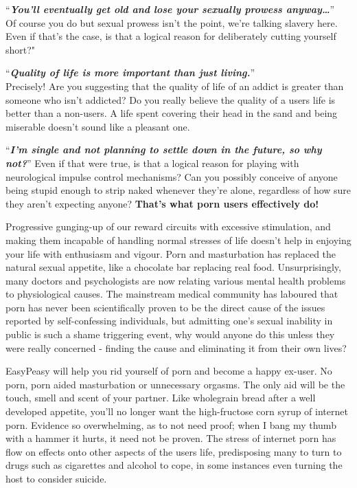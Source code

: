 \documentclass[
]{book}
\begin{document}
``\textbf{\emph{You'll eventually get old and lose your sexually prowess anyway\ldots{}}}''\\
Of course you do but sexual prowess isn't the point, we're talking slavery here. Even if that's the case, is that a logical reason for deliberately cutting yourself short?"

``\textbf{\emph{Quality of life is more important than just living.}}''\\
Precisely! Are you suggesting that the quality of life of an addict is greater than someone who isn't addicted? Do you really believe the quality of a users life is better than a non-users. A life spent covering their head in the sand and being miserable doesn't sound like a pleasant one.

``\textbf{\emph{I'm single and not planning to settle down in the future, so why not?}}''
Even if that were true, is that a logical reason for playing with neurological impulse control mechanisms? Can you possibly conceive of anyone being stupid enough to strip naked whenever they're alone, regardless of how sure they aren't expecting anyone? \textbf{That's what porn users effectively do!}

Progressive gunging-up of our reward circuits with excessive stimulation, and making them incapable of handling normal stresses of life doesn't help in enjoying your life with enthusiasm and vigour. Porn and masturbation has replaced the natural sexual appetite, like a chocolate bar replacing real food. Unsurprisingly, many doctors and psychologists are now relating various mental health problems to physiological causes. The mainstream medical community has laboured that porn has never been scientifically proven to be the direct cause of the issues reported by self-confessing individuals, but admitting one's sexual inability in public is such a shame triggering event, why would anyone do this unless they were really concerned - finding the cause and eliminating it from their own lives?

EasyPeasy will help you rid yourself of porn and become a happy ex-user. No porn, porn aided masturbation or unnecessary orgasms. The only aid will be the touch, smell and scent of your partner. Like wholegrain bread after a well developed appetite, you'll no longer want the high-fructose corn syrup of internet porn. Evidence so overwhelming, as to not need proof; when I bang my thumb with a hammer it hurts, it need not be proven. The stress of internet porn has flow on effects onto other aspects of the users life, predisposing many to turn to drugs such as cigarettes and alcohol to cope, in some instances even turning the host to consider suicide.
\end{document}
